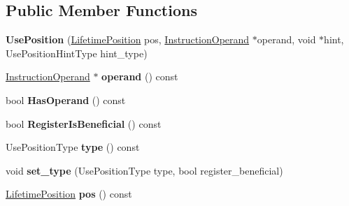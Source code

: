 \subsection*{Public Member Functions}
\begin{DoxyCompactItemize}
\item 
{\bfseries Use\+Position} (\hyperlink{classv8_1_1internal_1_1compiler_1_1_lifetime_position}{Lifetime\+Position} pos, \hyperlink{classv8_1_1internal_1_1compiler_1_1_instruction_operand}{Instruction\+Operand} $\ast$operand, void $\ast$hint, Use\+Position\+Hint\+Type hint\+\_\+type)\hypertarget{classv8_1_1internal_1_1compiler_1_1_use_position_a09f93db85bda57ad1eadbea6730fb561}{}\label{classv8_1_1internal_1_1compiler_1_1_use_position_a09f93db85bda57ad1eadbea6730fb561}

\item 
\hyperlink{classv8_1_1internal_1_1compiler_1_1_instruction_operand}{Instruction\+Operand} $\ast$ {\bfseries operand} () const \hypertarget{classv8_1_1internal_1_1compiler_1_1_use_position_a2173f16a2695083c3c4813e21d74c714}{}\label{classv8_1_1internal_1_1compiler_1_1_use_position_a2173f16a2695083c3c4813e21d74c714}

\item 
bool {\bfseries Has\+Operand} () const \hypertarget{classv8_1_1internal_1_1compiler_1_1_use_position_a76b027788fe61e86b6ddecf6b63d2975}{}\label{classv8_1_1internal_1_1compiler_1_1_use_position_a76b027788fe61e86b6ddecf6b63d2975}

\item 
bool {\bfseries Register\+Is\+Beneficial} () const \hypertarget{classv8_1_1internal_1_1compiler_1_1_use_position_af7422e0bb779b4a0ddbf070abca31bcd}{}\label{classv8_1_1internal_1_1compiler_1_1_use_position_af7422e0bb779b4a0ddbf070abca31bcd}

\item 
Use\+Position\+Type {\bfseries type} () const \hypertarget{classv8_1_1internal_1_1compiler_1_1_use_position_aaae79677ffe264a19301f24627da1bfe}{}\label{classv8_1_1internal_1_1compiler_1_1_use_position_aaae79677ffe264a19301f24627da1bfe}

\item 
void {\bfseries set\+\_\+type} (Use\+Position\+Type type, bool register\+\_\+beneficial)\hypertarget{classv8_1_1internal_1_1compiler_1_1_use_position_a97e321bd8c3a1b4cd7082ffd790cb5c1}{}\label{classv8_1_1internal_1_1compiler_1_1_use_position_a97e321bd8c3a1b4cd7082ffd790cb5c1}

\item 
\hyperlink{classv8_1_1internal_1_1compiler_1_1_lifetime_position}{Lifetime\+Position} {\bfseries pos} () const \hypertarget{classv8_1_1internal_1_1compiler_1_1_use_position_a3fa9175d3f5827718b7943c8bb16f6e6}{}\label{classv8_1_1internal_1_1compiler_1_1_use_position_a3fa9175d3f5827718b7943c8bb16f6e6}


\end{DoxyCompactItemize}
